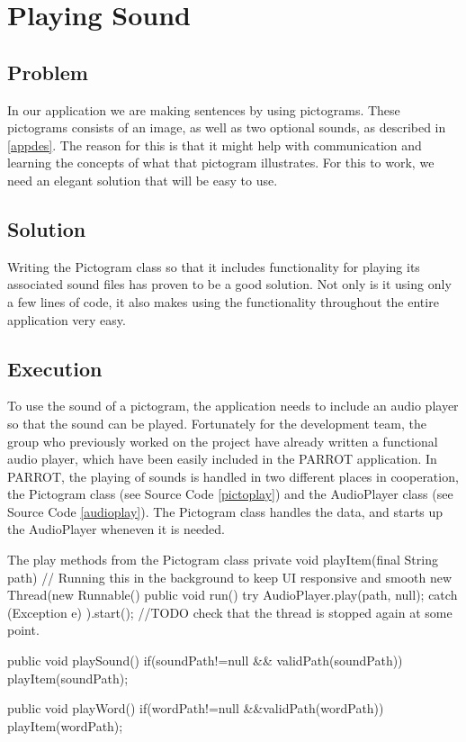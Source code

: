 \section{Playing Sound}
\subsection*{Problem}
In our application we are making sentences by using pictograms. These pictograms consists of an image, as well as two optional sounds, as described in \autoref{appdes}. The reason for this is that it might help with communication and learning the concepts of what that pictogram illustrates.
For this to work, we need an elegant solution that will be easy to use.

\subsection*{Solution}
Writing the Pictogram class so that it includes functionality for playing its associated sound files has proven to be a good solution. Not only is it using only a few lines of code, it also makes using the functionality throughout the entire application very easy.

\subsection*{Execution}
To use the sound of a pictogram, the application needs to include an audio player so that the sound can be played. Fortunately for the development team, the group who previously worked on the project have already written a functional audio player, which have been easily included in the PARROT application.\newline
In PARROT, the playing of sounds is handled in two different places in cooperation, the Pictogram class (see Source Code \ref{pictoplay}) and the AudioPlayer class (see Source Code \ref{audioplay}).\newline
The Pictogram class handles the data, and starts up the AudioPlayer wheneven it is needed.\newline

\begin{source}[{pictoplay}]{The play methods from the Pictogram class}{}
	private void playItem(final String path) {
		// Running this in the background to keep UI responsive and smooth
		new Thread(new Runnable() {
			public void run() {
				try {
					AudioPlayer.play(path, null);
				} catch (Exception e) {
				}
			}
		}).start();
		//TODO check that the thread is stopped again at some point.
	}

	public void playSound()
	{
		if(soundPath!=null && validPath(soundPath))
		{
			playItem(soundPath);
		}
	}

	public void playWord()
	{
		if(wordPath!=null &&validPath(wordPath))
		{
			playItem(wordPath);
		}
	}
\end{source}

